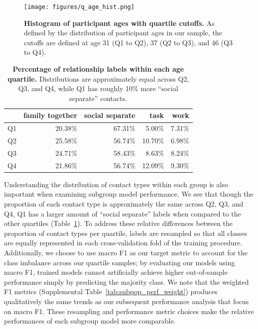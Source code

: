 \documentclass[acmlarge]{acmart}
\begin{document}
\begin{figure}
    \centering
    \texttt{[image: figures/q\_age\_hist.png]}
    \caption{\textbf{Histogram of participant ages with quartile cutoffs.} As defined by the distribution of participant ages in our sample, the cutoffs are defined at age 31 (Q1 to Q2), 37 (Q2 to Q3), and 46 (Q3 to Q4).}
    \label{fig:subpop_age_hist}    
\end{figure}

\begin{table}[]
    \centering
        \begin{tabular}{lrrrr}
        \toprule
        {} &  family together &  social separate &   task &  work \\
        \midrule
        Q1 &           20.38\% &           67.31\% &  5.00\% & 7.31\% \\
        Q2 &           25.58\% &           56.74\% & 10.70\% & 6.98\% \\
        Q3 &           24.71\% &           58.43\% &  8.63\% & 8.24\% \\
        Q4 &           21.86\% &           56.74\% & 12.09\% & 9.30\% \\
        \bottomrule
        \end{tabular}
    \caption{\textbf{Percentage of relationship labels within each age quartile.} Distributions are approximately equal across Q2, Q3, and Q4, while Q1 has roughly 10\% more ``social separate'' contacts.}
    \label{tab:subpop_contact_types}
\end{table}

Understanding the distribution of contact types within each group is also important when examining subgroup model performance. We see that though the proportion of each contact type is approximately the same across Q2, Q3, and Q4, Q1 has a larger amount of ``social separate'' labels when compared to the other quartiles (Table~\ref{tab:subpop_contact_types}). To address these relative differences between the proportion of contact types per quartile, labels are resampled so that all classes are equally represented in each cross-validation fold of the training procedure. Additionally, we choose to use macro F1 as our target metric to account for the class imbalance across our quartile samples; by evaluating our models using macro F1, trained models cannot artificially achieve higher out-of-sample performance simply by predicting the majority class. We note that the weighted F1 metrics (Supplemental Table~\ref{tab:subpop_perf_weight}) produces qualitatively the same trends as our subsequent performance analysis that focus on macro F1. These resampling and performance metric choices make the relative performances of each subgroup model more comparable.
\end{document}
